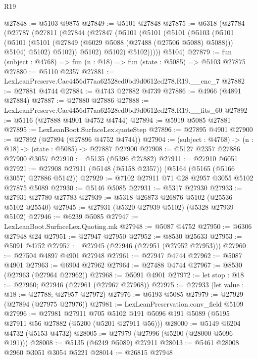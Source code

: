 \begin{lexlean}{R19}
\begin{coremodule}
{{{{{{{{{{{@27848 := @5103 @9875
@27849 := @5101 @27848
@27875 := @6318
    (@27784
      (@27787
        (@27811
          (@27844
            (@27847
              (@5101
                (@5101
                  (@5101
                    (@5103
                      (@5101
                        (@5101
                          (@5101 (@27849 (@6029 @5088 (@27488 (@27506 @5088) @5088))) @5104)
                          @5102)
                        @5102))
                    @5102)
                  @5102)
                @5102)))))
      @5104)
@27879 := fun (subject : @4768) => fun (n : @18) => fun (state : @5085) => @5103 @27875
@27880 := @5110 @2357
@27881 := LexLeanPreserve.Cae4456d77aa62528ed0bd9d0612cd278.R19.__enc_7
@27882 := @27881 @4744
@27884 := @4743 @27882 @4739
@27886 := @4966 (@4891 @27884)
@27887 := @27880 @27886
@27888 := LexLeanPreserve.Cae4456d77aa62528ed0bd9d0612cd278.R19.__fits_60
@27892 := @5116 (@27888 @4901 @4752 @4744)
@27894 := @5919 @5085 @27881
@27895 := LexLeanBoot.SurfaceLex.quoteStep
@27896 := @27895 @4901
@27900 := @27892 (@27894 (@27896 @4752 @4744))
@27904 := (subject : @4768) -> (n : @18) -> (state : @5085) -> @27887 @27900
@27908 := @5127 @2357 @27886 @27900 @3057
@27910 := @5135 (@5396 @27882)
@27911 := @27910 @6051
@27921 := @27908 @27911 (@5148 (@5158 @2357)) (@5164 (@5165 (@5166 @3057) @27886 @5142))
@27929 := @7102 @27911 @71 @28 @2957 @3055 @5102 @27875 @5089
@27930 := @5146 @5085
@27931 := @5317 @27930
@27933 := @27931 @27780 @27783
@27939 := @5318 @26873 @26876 @5102 (@25536 @5102 @25540)
@27945 := @27931 (@5320 @27939 @5102) (@5328 @27939 @5102)
@27946 := @6239 @5085
@27947 := LexLeanBoot.SurfaceLex.Quoting.mk
@27948 := @5087 @4752
@27950 := @6306 @27948 @24
@27951 := @27947 @27950
@27952 := @8530 @25633
@27953 := @5091 @4752
@27957 := @27945 (@27946 (@27951 (@27952 @27953)))
@27960 := @27504 @4897 @4901 @27948
@27961 := @27947 @4744
@27962 := @5087 @4901
@27963 := @6904 @27962
@27964 := @27488 @4744
@27967 := @8530 (@27963 (@27964 @27962))
@27968 := @5091 @4901
@27972 := let stop : @18 := @27960; @27946 (@27961 (@27967 @27968))
@27975 := @27933 (let value : @18 := @27788; @27957 @27972)
@27976 := @6193 @5085
@27979 := @27929 (@27894 (@27975 @27976))
@27981 := LexLeanPreservation.conv_field @5109
@27996 := @27981
    @27911
    @705
    @5102
    @191
    @5096
    @191
    @5089
    (@5195 @27911 @56 @27882 (@5200 (@5201 @27911 @56)))
@28000 := @5149 @6204 @4732 (@5153 @4732)
@28005 := @27979 (@27996 (@5200 (@28000 @5096 @191)))
@28008 := @5135 (@6249 @5089) @27911
@28013 := @5461 @28008 @2960 @3051 @3054 @5221
@28014 := @26815 @27948
}}}}}}}}}}}
\end{coremodule}
\end{lexlean}
